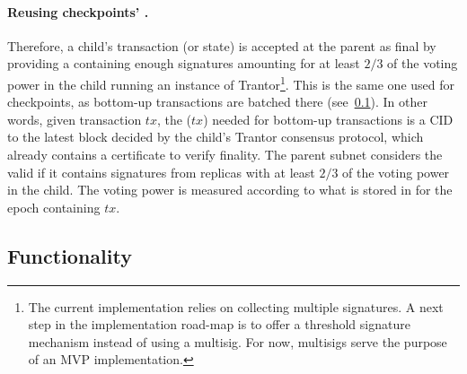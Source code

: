  \paragraph{Reusing checkpoints' \pof.}
Therefore, a child's transaction (or state) \tx is accepted at the parent as final by providing a \prf containing enough signatures amounting for at least $2/3$ of the voting power in the child running an instance of Trantor\footnote{The current implementation relies on collecting multiple signatures. A next step in the implementation road-map is to offer a threshold signature mechanism instead of using a multisig. For now, multisigs serve the purpose of an MVP implementation.}. This \pof is the same one used for checkpoints, as bottom-up transactions are batched there (see~\cref{sec:refimplfunc}). In other words, given transaction $tx$, the \prf($tx$) needed for bottom-up transactions is a CID to the latest block decided by the child's Trantor consensus protocol, which already contains a certificate to verify finality. The parent subnet considers the \prf valid if it contains signatures from replicas with at least $2/3$ of the voting power in the child. The voting power is measured according to what is stored in \sa for the epoch containing $tx$. 

\subsection{Functionality} 
\label{sec:refimplfunc}
